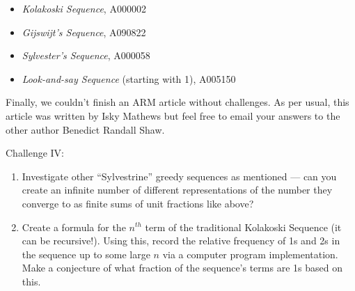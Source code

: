 \begin{itemize}
\item{\textit{Kolakoski Sequence}, A000002}
\item{\textit{Gijswijt’s Sequence}, A090822}
\item{\textit{Sylvester’s Sequence}, A000058}
\item{\textit{Look-and-say Sequence} (starting with 1), A005150}
\end{itemize}

Finally, we couldn’t finish an ARM article without challenges. As per usual, this article was written by Isky Mathews but feel free to email your answers to the other author Benedict Randall Shaw.

Challenge IV:
\begin{enumerate}
\item{Investigate other “Sylvestrine” greedy sequences as mentioned --- can you create an infinite number of different representations of the number they converge to as finite sums of unit fractions like above?}
\item{Create a formula for the \(n^{th}\) term of the traditional Kolakoski Sequence (it can be recursive!). Using this, record the relative frequency of 1s and 2s in the sequence up to some large \(n\) via a computer program implementation. Make a conjecture of what fraction of the sequence’s terms are 1s based on this.}
\end{enumerate}

